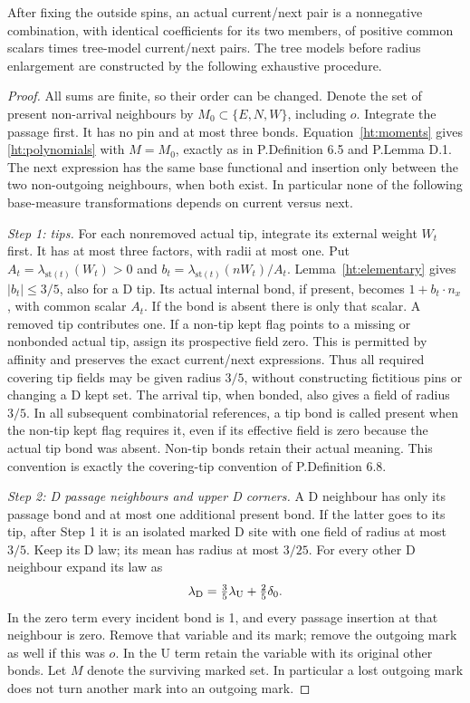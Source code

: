 \begin{htlem}
\label{ht:localcases}
After fixing the outside spins, an actual current/next pair is a
nonnegative combination, with identical coefficients for its two
members, of positive common scalars times tree-model current/next pairs.
The tree models before radius enlargement are constructed by the
following exhaustive procedure.
\end{htlem}
\begin{proof}
All sums are finite, so their order can be changed. Denote the set of
present non-arrival neighbours by \(M_0\subset\{E,N,W\}\), including
\(o\). Integrate the passage first. It has no pin and at most three
bonds. Equation~\eqref{ht:moments} gives \eqref{ht:polynomials} with
\(M=M_0\), exactly as in P.Definition 6.5 and P.Lemma D.1. The next
expression has the same base functional and insertion only between
the two non-outgoing neighbours, when both exist. In particular none
of the following base-measure transformations depends on current
versus next.

\emph{Step 1: tips.}
For each nonremoved actual tip, integrate its external weight \(W_t\)
first. It has at most three factors, with radii at most one. Put
\(A_t=\lambda_{\mathrm{st}(t)}(W_t)>0\) and
\(b_t=\lambda_{\mathrm{st}(t)}(nW_t)/A_t\).
Lemma~\ref{ht:elementary} gives \(|b_t|\le3/5\), also for a D tip.
Its actual internal bond, if present, becomes \(1+b_t\cdot n_x\),
with common scalar \(A_t\). If the bond is absent there is only that
scalar. A removed tip contributes one. If a non-tip kept flag points
to a missing or nonbonded actual tip, assign its prospective field zero.
This is permitted by affinity and preserves the exact current/next
expressions. Thus all required covering tip fields may be given radius
\(3/5\), without constructing fictitious pins or changing a D kept set.
The arrival tip, when bonded, also gives a field of radius \(3/5\).
In all subsequent combinatorial references, a tip bond is called present
when the non-tip kept flag requires it, even if its effective field is
zero because the actual tip bond was absent. Non-tip bonds retain their
actual meaning. This convention is exactly the covering-tip convention
of P.Definition 6.8.

\emph{Step 2: D passage neighbours and upper D corners.}
A D neighbour has only its passage bond and at most one additional
present bond. If the latter goes to its tip, after Step 1 it is an
isolated marked D site with one field of radius at most \(3/5\).
Keep its D law; its mean has radius at most \(3/25\).
For every other D neighbour expand its law as
\begin{equation}\label{ht:dlaw}
 \lambda_{\mathrm D}=\tfrac35\lambda_{\mathrm U}+\tfrac25\delta_0.
\end{equation}
In the zero term every incident bond is 1, and every passage insertion
at that neighbour is zero. Remove that variable and its mark; remove
the outgoing mark as well if this was \(o\). In the U term retain the
variable with its original other bonds. Let \(M\) denote the surviving
marked set. In particular a lost outgoing mark does not turn another
mark into an outgoing mark.


\end{proof}
